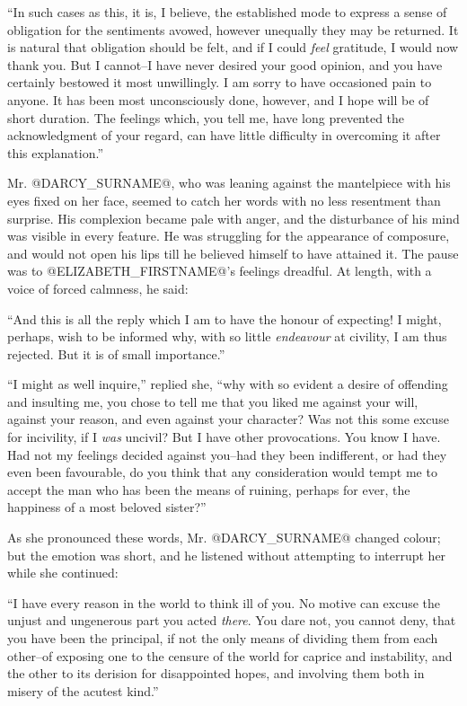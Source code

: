 ``In such cases as this, it is, I believe, the established mode to
express a sense of obligation for the sentiments avowed, however
unequally they may be returned. It is natural that obligation should
be felt, and if I could \textit{feel} gratitude, I would now thank you. But I
cannot--I have never desired your good opinion, and you have certainly
bestowed it most unwillingly. I am sorry to have occasioned pain to
anyone. It has been most unconsciously done, however, and I hope will be
of short duration. The feelings which, you tell me, have long prevented
the acknowledgment of your regard, can have little difficulty in
overcoming it after this explanation.''

Mr. @DARCY_SURNAME@, who was leaning against the mantelpiece with his eyes fixed
on her face, seemed to catch her words with no less resentment than
surprise. His complexion became pale with anger, and the disturbance
of his mind was visible in every feature. He was struggling for the
appearance of composure, and would not open his lips till he believed
himself to have attained it. The pause was to @ELIZABETH_FIRSTNAME@'s feelings
dreadful. At length, with a voice of forced calmness, he said:

``And this is all the reply which I am to have the honour of expecting!
I might, perhaps, wish to be informed why, with so little \textit{endeavour} at
civility, I am thus rejected. But it is of small importance.''

``I might as well inquire,'' replied she, ``why with so evident a desire
of offending and insulting me, you chose to tell me that you liked me
against your will, against your reason, and even against your character?
Was not this some excuse for incivility, if I \textit{was} uncivil? But I have
other provocations. You know I have. Had not my feelings decided against
you--had they been indifferent, or had they even been favourable, do you
think that any consideration would tempt me to accept the man who has
been the means of ruining, perhaps for ever, the happiness of a most
beloved sister?''

As she pronounced these words, Mr. @DARCY_SURNAME@ changed colour; but the emotion
was short, and he listened without attempting to interrupt her while she
continued:

``I have every reason in the world to think ill of you. No motive can
excuse the unjust and ungenerous part you acted \textit{there}. You dare not,
you cannot deny, that you have been the principal, if not the only means
of dividing them from each other--of exposing one to the censure of the
world for caprice and instability, and the other to its derision for
disappointed hopes, and involving them both in misery of the acutest
kind.''

